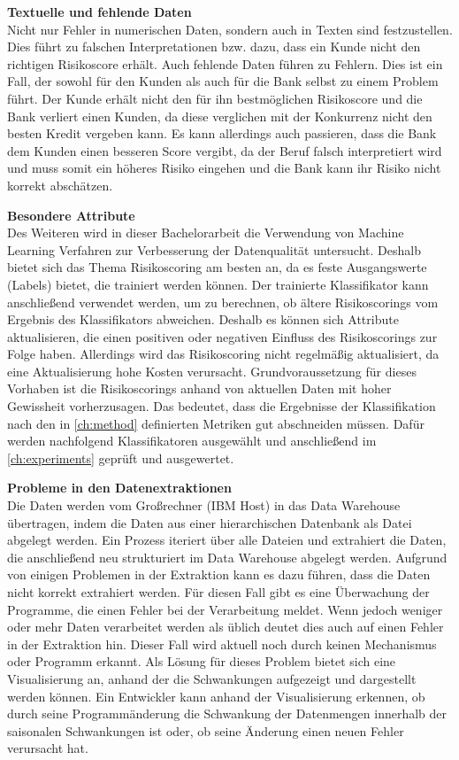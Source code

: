 \textbf{Textuelle und fehlende Daten} \\
Nicht nur Fehler in numerischen Daten, sondern auch in Texten sind festzustellen. 
Dies führt zu falschen Interpretationen bzw. dazu, dass ein Kunde nicht den richtigen Risikoscore erhält. 
Auch fehlende Daten führen zu Fehlern.
Dies ist ein Fall, der sowohl für den Kunden als auch für die Bank selbst zu einem Problem führt. 
Der Kunde erhält nicht den für ihn bestmöglichen Risikoscore und die Bank verliert einen Kunden, da diese verglichen mit der Konkurrenz nicht den besten Kredit vergeben kann. 
Es kann allerdings auch passieren, dass die Bank dem Kunden einen besseren Score vergibt, da der Beruf falsch interpretiert wird und muss somit ein höheres Risiko eingehen und die Bank kann ihr Risiko nicht korrekt abschätzen.


\textbf{Besondere Attribute} \\
Des Weiteren wird in dieser Bachelorarbeit die Verwendung von Machine Learning Verfahren zur Verbesserung der Datenqualität untersucht.
Deshalb bietet sich das Thema Risikoscoring am besten an, da es feste Ausgangswerte (Labels) bietet, die trainiert werden können.
Der trainierte Klassifikator kann anschließend verwendet werden, um zu berechnen, ob ältere Risikoscorings vom Ergebnis des Klassifikators abweichen.
Deshalb es können sich Attribute aktualisieren, die einen positiven oder negativen Einfluss des Risikoscorings zur Folge haben. 
Allerdings wird das Risikoscoring nicht regelmäßig aktualisiert, da eine Aktualisierung hohe Kosten verursacht.
Grundvoraussetzung für dieses Vorhaben ist die Risikoscorings anhand von aktuellen Daten mit hoher Gewissheit vorherzusagen. 
Das bedeutet, dass die Ergebnisse der Klassifikation nach den in \autoref{ch:method} definierten Metriken gut abschneiden müssen. 
Dafür werden nachfolgend Klassifikatoren ausgewählt und anschließend im \autoref{ch:experiments} geprüft und ausgewertet.

\textbf{Probleme in den Datenextraktionen} \\
Die Daten werden vom Großrechner (IBM Host) in das Data Warehouse übertragen, indem die Daten aus einer hierarchischen Datenbank als Datei abgelegt werden.
Ein Prozess iteriert über alle Dateien und extrahiert die Daten, die anschließend neu strukturiert im Data Warehouse abgelegt werden.
Aufgrund von einigen Problemen in der Extraktion kann es dazu führen, dass die Daten nicht korrekt extrahiert werden.
Für diesen Fall gibt es eine Überwachung der Programme, die einen Fehler bei der Verarbeitung meldet.
Wenn jedoch weniger oder mehr Daten verarbeitet werden als üblich deutet dies auch auf einen Fehler in der Extraktion hin. 
Dieser Fall wird aktuell noch durch keinen Mechanismus oder Programm erkannt. 
Als Lösung für dieses Problem bietet sich eine Visualisierung an, anhand der die Schwankungen aufgezeigt und dargestellt werden können. 
Ein Entwickler kann anhand der Visualisierung erkennen, ob durch seine Programmänderung die Schwankung der Datenmengen innerhalb der saisonalen Schwankungen ist oder, ob seine Änderung einen neuen Fehler verursacht hat. 






